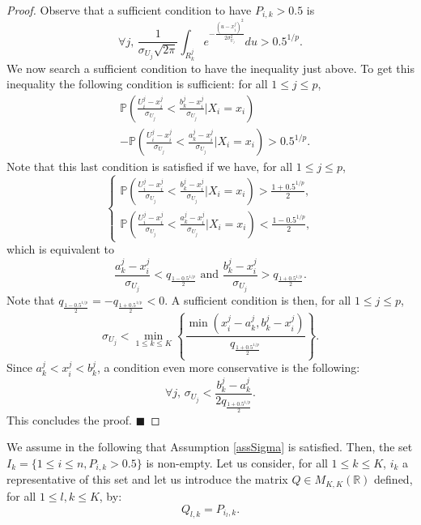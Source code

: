 \begin{proof}
Observe that a sufficient condition to have $P_{i,k}>0.5$ is
\[
\forall j,\, \frac{1}{\sigma_{U_j}\sqrt{2\pi}}\int_{R_k^j}e^{-\frac{(u-x_i^j)^2}{2\sigma_{U_j}^2}}du>0.5^{1/p}.
\]
We now search a sufficient condition to have the inequality just above. To get this inequality the following condition is sufficient: for all $1\leq j\leq p$,
\begin{align}
&\mathbb{P}\left(\frac{U_i^j-x_i^j}{\sigma_{U_j}}<\frac{b_k^j-x_i^j}{\sigma_{U_j}}|X_i=x_i\right) \nonumber\\
&-\mathbb{P}\left(\frac{U_i^j-x_i^j}{\sigma_{U_j}}<\frac{a_k^j-x_i^j}{\sigma_{U_j}}|X_i=x_i\right)>0.5^{1/p}.\label{eq:diff-proba}
\end{align}
Note that this last condition is satisfied if we have, for all $1\leq j \leq p$,
 \begin{equation*}
    \left\{
\begin{array}{l}
   \mathbb{P}\left(\frac{U_i^j-x_i^j}{\sigma_{U_j}}<\frac{b_k^j-x_i^j}{\sigma_{U_j}}|X_i=x_i\right)>\frac{1+0.5^{1/p}}{2},\\
   \mathbb{P}\left(\frac{U_i^j-x_i^j}{\sigma_{U_j}}<\frac{a_k^j-x_i^j}{\sigma_{U_j}}|X_i=x_i\right)<\frac{1-0.5^{1/p}}{2},
\end{array}
\right.
\end{equation*}
which is equivalent to
\[
\frac{a_k^j-x_i^j}{\sigma_{U_j}}<q_{\frac{1-0.5^{1/p}}{2}}\mbox{ and }\frac{b_k^j-x_i^j}{\sigma_{U_j}}>q_{\frac{1+0.5^{1/p}}{2}}.
\]
Note that $q_{\frac{1-0.5^{1/p}}{2}}=-q_{\frac{1+0.5^{1/p}}{2}}<0$. A sufficient condition is then, for all $1\leq j \leq p$,
\[
\sigma_{U_j}<\min_{1\leq k \leq K} \left\{  \frac{\min\left(x_i^j-a_k^j,b_k^j-x_i^j\right)}{q_{\frac{1+0.5^{1/p}}{2}}}\right\}.
\]
Since  $a_k^j<x_i^j<b_k^j$, a condition even more conservative is the following:
\[
\forall j,\, \sigma_{U_j}<\frac{b_k^j-a_k^j}{2q_{\frac{1+0.5^{1/p}}{2}}}.
\]
This concludes the proof.
\hfill $\blacksquare$
\end{proof}

We assume in the following that Assumption \eqref{assSigma} is satisfied. Then, the set $I_k = \{1\leq i \leq n, P_{i,k} >0.5 \}$ is non-empty. Let us consider, for all $1\leq k\leq K$, $i_k$ a representative of this set and let us introduce the matrix $Q \in M_{K,K}(\mathbb{R})$ defined, for all $1\leq l,k \leq K$, by:
%
\[
Q_{l,k} = P_{i_l,k}.
\]
%

